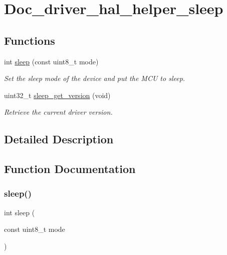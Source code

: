 \hypertarget{group__doc__driver__hal__helper__sleep}{}\section{Doc\+\_\+driver\+\_\+hal\+\_\+helper\+\_\+sleep}
\label{group__doc__driver__hal__helper__sleep}
\subsection*{Functions}
\begin{DoxyCompactItemize}
\item 
int \hyperlink{group__doc__driver__hal__helper__sleep_gab004676b3011ffebede7c473a5cdfccc}{sleep} (const uint8\+\_\+t mode)
\begin{DoxyCompactList}\small\item\em Set the sleep mode of the device and put the M\+CU to sleep. \end{DoxyCompactList}\item 
uint32\+\_\+t \hyperlink{group__doc__driver__hal__helper__sleep_gaab8a7b5dfa992a33c63e63ed98e4b105}{sleep\+\_\+get\+\_\+version} (void)
\begin{DoxyCompactList}\small\item\em Retrieve the current driver version. \end{DoxyCompactList}\end{DoxyCompactItemize}


\subsection{Detailed Description}


\subsection{Function Documentation}
\mbox{\label{group__doc__driver__hal__helper__sleep_gab004676b3011ffebede7c473a5cdfccc}} 
\subsubsection{\texorpdfstring{sleep()}{sleep()}}
{\footnotesize\ttfamily int sleep (\begin{DoxyParamCaption}\item[{const uint8\+\_\+t}]{mode }\end{DoxyParamCaption})}



